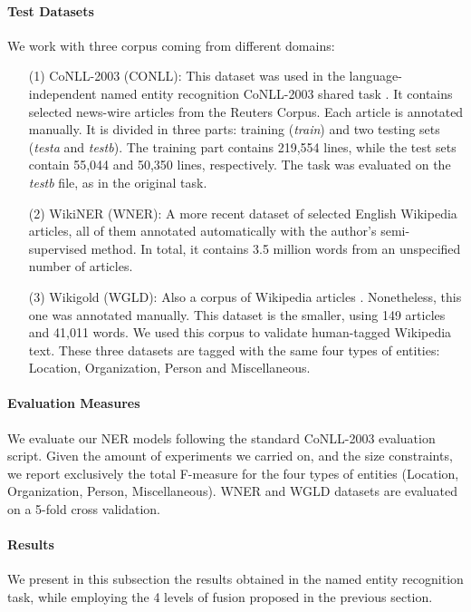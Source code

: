 \paragraph{Test Datasets}We work with three corpus coming from different domains:
\begin{itemize}
\item [(1)] CoNLL-2003 (CONLL): This dataset was used in the language-independent named entity recognition CoNLL-2003 shared task \cite{SangM03}. It contains selected news-wire articles from the Reuters Corpus. Each article is annotated manually. It is divided in three parts:  training (\textit{train}) and two testing sets (\textit{testa} and \textit{testb}). The training part contains 219,554 lines, while the test sets contain 55,044 and 50,350 lines, respectively. The task was evaluated on the \textit{testb} file, as in the original task.
\item [(2)]WikiNER (WNER): A more recent dataset \cite{Nothman2009} of selected English \allowbreak Wikipedia articles, all of them annotated automatically with the author's semi-supervised \allowbreak method. In total, it contains 3.5 million words from an unspecified number of articles. 
\item[(3)] Wikigold (WGLD): Also a corpus of Wikipedia articles \cite{Balasuriya2009}. Nonetheless, this one was annotated manually. This dataset is the smaller, using 149 articles and 41,011 words. We used this corpus to validate human-tagged Wikipedia text. These three datasets are tagged with the same four types of entities: Location, Organization, Person and Miscellaneous.


\end{itemize}
%
\paragraph{Evaluation Measures}
We evaluate our NER models following the standard CoNLL-2003 evaluation script. Given the amount of experiments we carried on, and the size constraints, we report exclusively the total F-measure for the four types of entities (Location, Organization, Person, Miscellaneous). WNER and WGLD datasets are evaluated on a 5-fold cross validation.

\paragraph{Results}
We present in this subsection the results obtained in the named entity recognition task, while employing the 4 levels of fusion proposed in the previous section.

